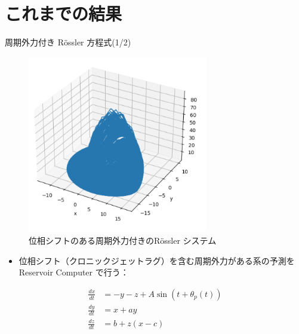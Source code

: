 \section{これまでの結果}

\begin{frame}{周期外力付き Rössler 方程式(1/2)}        
    \begin{minipage}{0.4\textwidth}
            \begin{figure}
                \includegraphics[width=0.7\textwidth]{Fig/Rossler_attractor.png}
                \caption{位相シフトのある周期外力付きのRössler システム}
                \label{rossler_attractor.png} %
            \end{figure}
            \vspace{-.7cm}
            \begin{itemize}
                \item 位相シフト（クロニックジェットラグ）を含む周期外力がある系の予測を Reservoir Computer で行う：
            \end{itemize}
        \end{minipage}
    \begin{minipage}{0.59\textwidth}
        \vspace{-1.0cm}
        \begin{align}
            \frac{dx}{dt} &= -y - z + A \sin(t + \theta_p(t))\\
            \frac{dy}{dt} &= x + ay \\
            \frac{dz}{dt} &= b + z(x - c)
        \end{align}
        \vspace{-.5cm}

\end{minipage}
\end{frame}
